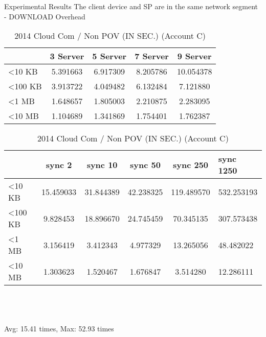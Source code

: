 \begin{frame}{Experimental Results}
{The client device and SP are in the same network segment - DOWNLOAD Overhead}
	\scriptsize
    \begin{table}[]
    \centering
    \caption{My Method / Non POV (IN SEC.) (Account C)}
    \begin{tabular}{lcccc}
                         & 3 Server & 5 Server & 7 Server & 9 Server  \\ \hline
        \textless 10 KB  & 5.391663 & 6.917309 & 8.205786 & 10.054378 \\ \hline
        \textless 100 KB & 3.913722 & 4.049482 & 6.132484 & 7.121880  \\ \hline
        \textless 1 MB   & 1.648657 & 1.805003 & 2.210875 & 2.283095  \\ \hline
        \textless 10 MB  & 1.104689 & 1.341869 & 1.754401 & 1.762387  \\ \hline
    \end{tabular}
    \caption{2014 Cloud Com / Non POV (IN SEC.) (Account C)}
    \begin{tabular}{lccccl}
                         & sync 2    & sync 10   & sync 50   & sync 250   & sync 1250  \\ \hline
        \textless 10 KB  & 15.459033 & 31.844389 & 42.238325 & 119.489570 & 532.253193 \\ \hline
        \textless 100 KB & 9.828453  & 18.896670 & 24.745459 & 70.345135  & 307.573438 \\ \hline
        \textless 1 MB   & 3.156419  & 3.412343  & 4.977329  & 13.265056  & 48.482022  \\ \hline
        \textless 10 MB  & 1.303623  & 1.520467  & 1.676847  & 3.514280   & 12.286111  \\ \hline
    \end{tabular}
    ~\\
    ~\\
    ~\\
    \alert{Avg: 15.41 times, Max: 52.93 times}
    \end{table}
\end{frame}

